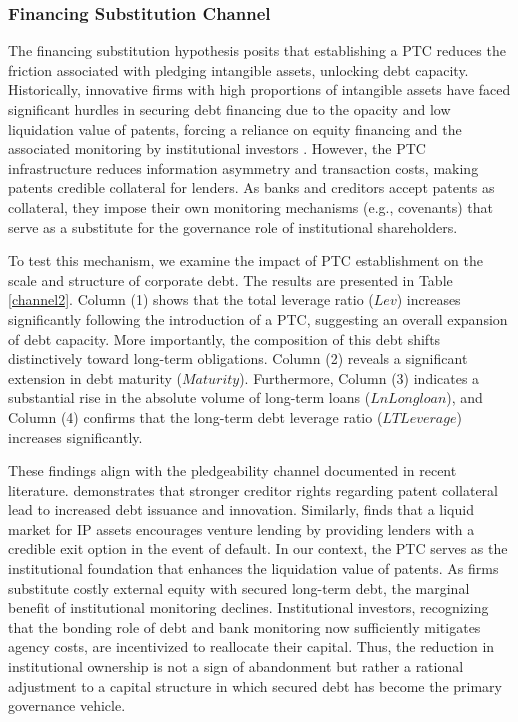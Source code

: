 \documentclass[12pt,a4paper]{article}
\begin{document}
\subsubsection{Financing Substitution Channel}
The financing substitution hypothesis posits that establishing a PTC reduces the friction associated with pledging intangible assets, unlocking debt capacity. Historically, innovative firms with high proportions of intangible assets have faced significant hurdles in securing debt financing due to the opacity and low liquidation value of patents, forcing a reliance on equity financing and the associated monitoring by institutional investors \citep{falato2022rising}. However, the PTC infrastructure reduces information asymmetry and transaction costs, making patents credible collateral for lenders. As banks and creditors accept patents as collateral, they impose their own monitoring mechanisms (e.g., covenants) that serve as a substitute for the governance role of institutional shareholders.

To test this mechanism, we examine the impact of PTC establishment on the scale and structure of corporate debt. The results are presented in Table \ref{channel2}. Column (1) shows that the total leverage ratio ($Lev$) increases significantly following the introduction of a PTC, suggesting an overall expansion of debt capacity. More importantly, the composition of this debt shifts distinctively toward long-term obligations. Column (2) reveals a significant extension in debt maturity ($Maturity$). Furthermore, Column (3) indicates a substantial rise in the absolute volume of long-term loans ($LnLongloan$), and Column (4) confirms that the long-term debt leverage ratio ($LTLeverage$) increases significantly.

These findings align with the pledgeability channel documented in recent literature. \cite{mann2018creditor} demonstrates that stronger creditor rights regarding patent collateral lead to increased debt issuance and innovation. Similarly, \cite{hochberg2018patent} finds that a liquid market for IP assets encourages venture lending by providing lenders with a credible exit option in the event of default. In our context, the PTC serves as the institutional foundation that enhances the liquidation value of patents. As firms substitute costly external equity with secured long-term debt, the marginal benefit of institutional monitoring declines. Institutional investors, recognizing that the bonding role of debt and bank monitoring now sufficiently mitigates agency costs, are incentivized to reallocate their capital. Thus, the reduction in institutional ownership is not a sign of abandonment but rather a rational adjustment to a capital structure in which secured debt has become the primary governance vehicle.
\end{document}
